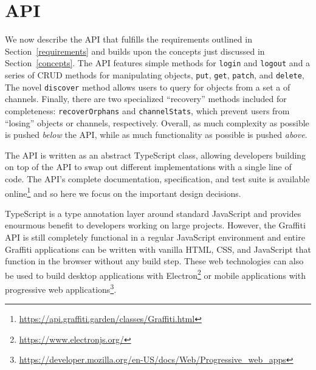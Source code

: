 \section{API}
\label{api}

We now describe the API that fulfills the requirements
outlined in Section~\ref{requirements} and builds upon the concepts
just discussed in Section~\ref{concepts}.
The API features simple methods for \texttt{login} and \texttt{logout}
and a series of CRUD methods for manipulating objects,
\texttt{put}, \texttt{get}, \texttt{patch}, and \texttt{delete},
The novel \texttt{discover} method allows users to query for objects
from a set a of channels.
Finally, there are two specialized ``recovery'' methods included for completeness:
\texttt{recoverOrphans} and \texttt{channelStats},
which prevent users from ``losing'' objects or channels, respectively.
Overall, as much complexity as possible is pushed \emph{below} the API,
while as much functionality as possible is pushed \emph{above}.

The API is written as an abstract TypeScript class, allowing
developers building on top of the API to swap out different implementations
with a single line of code.
The API's complete documentation, specification, and test suite is available online\footnote{
    \url{https://api.graffiti.garden/classes/Graffiti.html}
} and so here we focus on the important design decisions.

TypeScript is a type annotation layer around standard JavaScript
and provides enourmous benefit to developers working on large projects.
However, the Graffiti API is still completely functional
in a regular JavaScript environment and entire Graffiti applications can be written
with vanilla HTML, CSS, and JavaScript that function in the browser without
any build step.
These web technologies can also be used to build desktop applications
with Electron\footnote{
    \url{https://www.electronjs.org/}
} or mobile applications with progressive web applications\footnote{
    \url{https://developer.mozilla.org/en-US/docs/Web/Progressive_web_apps}
}.


